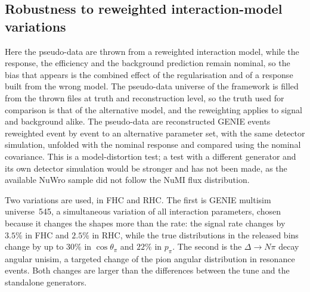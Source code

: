 \documentclass[11pt,a4paper]{article}
\begin{document}
\subsection{Robustness to reweighted interaction-model variations}
\label{sec:altmodel}

Here the pseudo-data are thrown from a reweighted interaction model, while the response, the
efficiency and the background prediction remain nominal, so the bias that appears is the combined
effect of the regularisation and of a response built from the wrong model. The pseudo-data universe
of the framework is filled from the thrown files at truth and reconstruction level, so the truth
used for comparison is that of the alternative model, and the reweighting applies to signal and
background alike. The pseudo-data are reconstructed GENIE events reweighted event by event to an
alternative parameter set, with the same detector simulation, unfolded with the nominal response and
compared using the nominal covariance. This is a model-distortion test; a test with a different
generator and its own detector simulation would be stronger and has not been made, as the available NuWro sample did not follow the NuMI flux distribution. 

Two variations are used, in FHC and RHC. The first is GENIE multisim universe~545, a simultaneous
variation of all interaction parameters, chosen because it changes the shapes more than the rate:
the signal rate changes by $3.5\%$ in FHC and $2.5\%$ in RHC, while the true distributions in the released
bins change by up to $30\%$ in $\cos\theta_\pi$ and $22\%$ in $p_\pi$. The second is the $\Delta\to N\pi$ decay angular unisim, a
targeted change of the pion angular distribution in resonance events. Both changes are larger than
the differences between the tune and the standalone generators.
\end{document}
